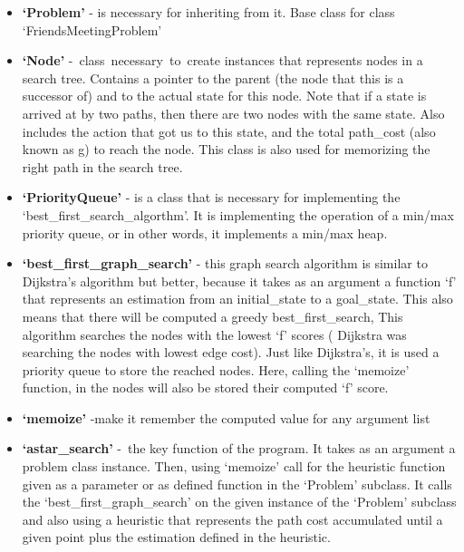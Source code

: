 \documentclass[12pt]{article}
\begin{document}
\begin{itemize}
	\item \textbf{‘Problem’} - is necessary for inheriting from it. Base class for class ‘FriendsMeetingProblem’\par

	\item \textbf{‘Node’ }-\ class\ necessary\ to\ create instances that represents nodes in a search tree.   Contains a pointer to the parent (the node that this is a successor of) and to the actual state for this node. Note that if a state is arrived at by two paths, then there are two nodes with the same state.  Also includes the action that got us to this state, and the total path\_cost (also known as g) to reach the node.  This class is also used for memorizing the right path in the search tree.\par

	\item \textbf{‘PriorityQueue’} - is a class that is necessary for implementing the ‘best\_first\_search\_algorthm’. It is implementing the operation of a min/max priority queue, or in other words, it implements a min/max heap.\par

	\item \textbf{‘best\_first\_graph\_search’} - this graph search algorithm is similar to Dijkstra’s algorithm but better, because it takes as an argument a function ‘f’ that represents an estimation from an initial\_state to a goal\_state. This also means that there will be computed a greedy best\_first\_search, This algorithm searches the nodes with the lowest ‘f’ scores ( Dijkstra was searching the nodes with lowest edge cost). Just like Dijkstra’s, it is used a priority queue to store the reached nodes. Here, calling the ‘memoize’ function, in the nodes will also be stored their computed ‘f’ score.\par

	\item \textbf{‘memoize’ }-make it remember the computed value for any argument list\par

	\item \textbf{‘astar\_search’ }-\ the key function of the program. It takes as an argument a problem class instance. Then, using ‘memoize’ call for the heuristic function given as a parameter or as defined function in the ‘Problem’ subclass. It calls the ‘best\_first\_graph\_search’  on the given instance of the ‘Problem’ subclass and also using a heuristic that represents the path cost accumulated until a given point plus the estimation defined in the heuristic. 
\end{itemize}\par
\end{document}
